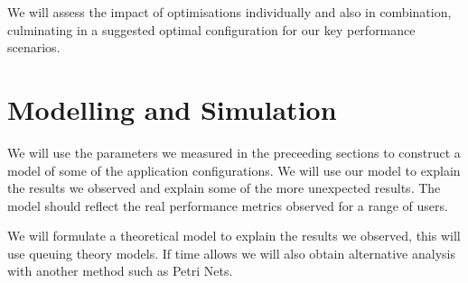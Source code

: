 We will assess the impact of optimisations individually and also in combination, culminating in a suggested optimal configuration for our key performance scenarios.

\section{Modelling and Simulation}
We will use the parameters we measured in the preceeding sections to construct a model of some of the application configurations. We will use our model to explain the results we observed and explain some of the more unexpected results. The model should reflect the real performance metrics observed for a range of users.

We will formulate a theoretical model to explain the results we observed, this will use queuing theory models. If time allows we will also obtain alternative analysis with another method such as Petri Nets.
